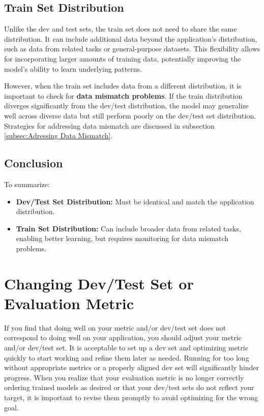 \documentclass[12pt,openany, draft]{book}
\begin{document}
\subsection{Train Set Distribution}
Unlike the dev and test sets, the train set does not need to share the same distribution. It can include additional data beyond the application’s distribution, such as data from related tasks or general-purpose datasets. This flexibility allows for incorporating larger amounts of training data, potentially improving the model’s ability to learn underlying patterns. \newline

However, when the train set includes data from a different distribution, it is important to check for \textbf{data mismatch problems}. If the train distribution diverges significantly from the dev/test distribution, the model may generalize well across diverse data but still perform poorly on the dev/test set distribution. Strategies for addressing data mismatch are discussed in subsection \ref{subsec:Adressing Data Mismatch}.


\subsection{Conclusion}
To summarize:
\begin{itemize}
    \item \textbf{Dev/Test Set Distribution:} Must be identical and match the application distribution.
    \item \textbf{Train Set Distribution:} Can include broader data from related tasks, enabling better learning, but requires monitoring for data mismatch problems.
\end{itemize}



\section{Changing Dev/Test Set or Evaluation Metric}

If you find that doing well on your metric and/or dev/test set does not correspond to doing well on your application, you should adjust your metric and/or dev/test set. It is acceptable to set up a dev set and optimizing metric quickly to start working and refine them later as needed. Running for too long without appropriate metrics or a properly aligned dev set will significantly hinder progress. When you realize that your evaluation metric is no longer correctly ordering trained models as desired or that your dev/test sets do not reflect your target, it is important to revise them promptly to avoid optimizing for the wrong goal. \newline
\end{document}

